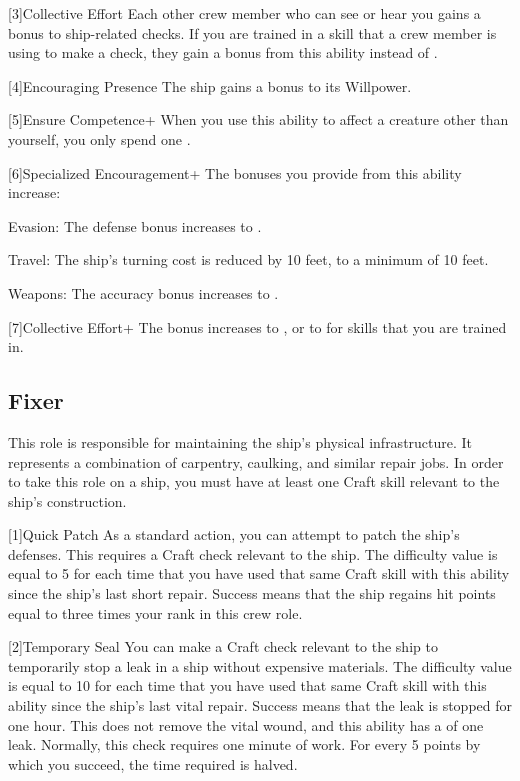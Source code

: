     [3]{Collective Effort} Each other crew member who can see or hear you gains a  bonus to ship-related checks.
      If you are trained in a skill that a crew member is using to make a check, they gain a  bonus from this ability instead of .

    [4]{Encouraging Presence} The ship gains a  bonus to its Willpower.

    [5]{Ensure Competence+} When you use this ability to affect a creature other than yourself, you only spend one .

    [6]{Specialized Encouragement+} The bonuses you provide from this ability increase:
      \begin{raggeditemize}
        \item Evasion: The defense bonus increases to .
        \item Travel: The ship's turning cost is reduced by 10 feet, to a minimum of 10 feet.
        \item Weapons: The accuracy bonus increases to .
      \end{raggeditemize}

    [7]{Collective Effort+} The bonus increases to , or to  for skills that you are trained in.

  \subsection{Fixer}
    This role is responsible for maintaining the ship's physical infrastructure.
    It represents a combination of carpentry, caulking, and similar repair jobs.
    In order to take this role on a ship, you must have at least one Craft skill relevant to the ship's construction.

    [1]{Quick Patch} As a standard action, you can attempt to patch the ship's defenses.
      This requires a Craft check relevant to the ship.
      The difficulty value is equal to 5  for each time that you have used that same Craft skill with this ability since the ship's last short repair.
      Success means that the ship regains hit points equal to three times your rank in this crew role.

    [2]{Temporary Seal} You can make a Craft check relevant to the ship to temporarily stop a leak in a ship without expensive materials.
      The difficulty value is equal to 10  for each time that you have used that same Craft skill with this ability since the ship's last vital repair.
      Success means that the leak is stopped for one hour.
      This does not remove the vital wound, and this ability has a  of one leak.
      Normally, this check requires one minute of work.
      For every 5 points by which you succeed, the time required is halved.

